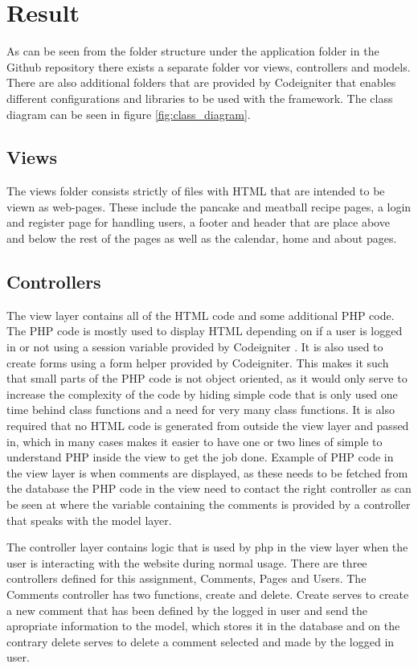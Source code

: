 \documentclass[a4paper]{scrartcl}
\begin{document}
\section{Result}

As can be seen from the folder structure under the application folder in the Github repository \citet{kimblad_git_2019} there exists a separate folder vor views, controllers and models. There are also additional folders that are provided by Codeigniter that enables different configurations and libraries to be used with the framework. The class diagram can be seen in figure \ref{fig:class_diagram}.

\subsection{Views}
The views folder consists strictly of files with HTML that are intended to be viewn as web-pages. These include the pancake and meatball recipe pages, a login and register page for handling users, a footer and header that are place above and below the rest of the pages as well as the calendar, home and about pages.

\subsection{Controllers}
The view layer contains all of the HTML code and some additional PHP code. The PHP code is mostly used to display HTML depending on if a user is logged in or not using a session variable provided by Codeigniter \citet{kimblad_git_2019-session}.
It is also used to create forms using a form helper provided by Codeigniter. This makes it such that small parts of the PHP code is not object oriented, as it would only serve to increase the complexity of the code by hiding simple code that is only used one time behind class functions and a need for very many class functions. It is also required that no HTML code is generated from outside the view layer and passed in, which in many cases makes it easier to have one or two lines of simple to understand PHP inside the view to get the job done.
Example of PHP code in the view layer is when comments are displayed, as these needs to be fetched from the database the PHP code in the view need to contact the right controller as can be seen at \citet{kimblad_git_2019-1} where the variable containing the comments is provided by a controller that speaks with the model layer. 

The controller layer contains logic that is used by php in the view layer when the user is interacting with the website during normal usage. There are three controllers defined for this assignment, Comments, Pages and Users. The Comments controller has two functions, create and delete. 
Create serves to create a new comment that has been defined by the logged in user and send the apropriate information to the model, which stores it in the database and on the contrary delete serves to delete a comment selected and made by the logged in user. 
\end{document}
